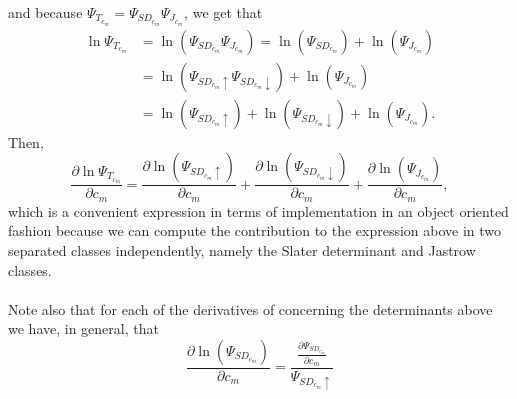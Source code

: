 and because $\Psi_{T_{c_m}} = \Psi_{{SD}_{c_m}} \Psi_{{J}_{c_m}}$, we get that 
\begin{align*}
 \ln \Psi_{T_{c_m}} & = \ln(\Psi_{{SD}_{c_m}} \Psi_{J_{c_m}}) = \ln(\Psi_{{SD}_{c_m}}) + \ln(\Psi_{J_{c_m}}) \\
                          & = \ln(\Psi_{{{SD}_{c_m}\uparrow}} \Psi_{{{SD}_{c_m}\downarrow}}) + \ln(\Psi_{J_{c_m}}) \\ 
                          & = \ln(\Psi_{{{SD}_{c_m}}\uparrow}) + \ln({\Psi_{{SD}_{c_m}\downarrow}}) + \ln(\Psi_{J_{c_m}}).
\end{align*}
Then,
\begin{equation}\label{derLnPsi}
 \boxed{
 \frac{\partial \ln \Psi_{T_{c_m}}}{\partial c_m} = \frac{\partial \ln(\Psi_{{SD_{c_m}}\uparrow})}{\partial c_m} + \frac{\partial \ln(\Psi_{{SD}_{c_m}\downarrow})}{\partial c_m}  + \frac{\partial \ln(\Psi_{J_{c_m}})}{\partial c_m}
 },
\end{equation}
which is a convenient expression in terms of implementation in an object oriented fa\-shion because we can compute the contribution to the expression above in two separated classes independently, namely the Slater determinant and Jastrow  classes.\\
\\
\noindent
Note also that for each of the derivatives of concerning the determinants above we have, in general, that
$$\frac{\partial \ln(\Psi_{{SD_{c_m}}})}{\partial c_m} = \frac{\frac{\partial \Psi_{{SD_{c_m}}}}{\partial c_m}}{\Psi_{{SD_{c_m}}\uparrow}}$$

